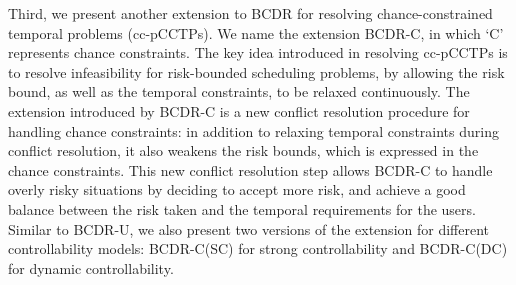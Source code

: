 \documentclass[jair,twoside,11pt,theapa]{article}
\begin{document}
%
%
%
%
%
%


Third, we present another extension to BCDR for resolving chance-constrained
temporal problems (cc-pCCTPs). We name the extension BCDR-C, in which `C'
represents chance constraints. The key idea introduced in resolving cc-pCCTPs is
to resolve infeasibility for risk-bounded scheduling problems, by allowing the
risk bound, as well as the temporal constraints, to be relaxed continuously. The
extension introduced by BCDR-C is a new conflict resolution procedure for
handling chance constraints: in addition to relaxing temporal constraints during
conflict resolution, it also weakens the risk bounds, which is expressed in the
chance constraints. This new conflict resolution step allows BCDR-C to handle
overly risky situations by deciding to accept more risk, and achieve a good
balance between the risk taken and the temporal requirements for the users. Similar to BCDR-U, we also present two versions of the extension for different controllability models: BCDR-C(SC) for strong controllability and BCDR-C(DC) for dynamic controllability.


%


%
%
\end{document}
